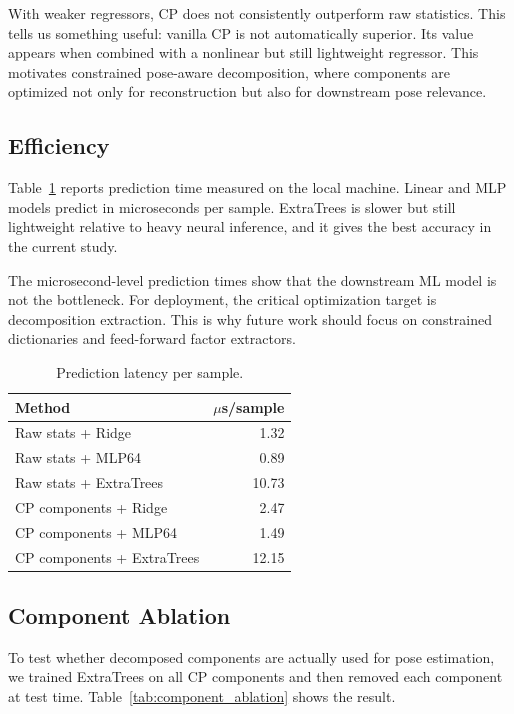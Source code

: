 \documentclass[letterpaper]{article}
\begin{document}
With weaker regressors, CP does not consistently outperform raw statistics. This tells us something useful: vanilla CP is not automatically superior. Its value appears when combined with a nonlinear but still lightweight regressor. This motivates constrained pose-aware decomposition, where components are optimized not only for reconstruction but also for downstream pose relevance.

\subsection{Efficiency}

Table~\ref{tab:efficiency} reports prediction time measured on the local machine. Linear and MLP models predict in microseconds per sample. ExtraTrees is slower but still lightweight relative to heavy neural inference, and it gives the best accuracy in the current study.

The microsecond-level prediction times show that the downstream ML model is not the bottleneck. For deployment, the critical optimization target is decomposition extraction. This is why future work should focus on constrained dictionaries and feed-forward factor extractors.

\begin{table}[t]
\centering
\caption{Prediction latency per sample.}
\label{tab:efficiency}
\begin{tabular}{lr}
\toprule
Method & $\mu$s/sample \\
\midrule
Raw stats + Ridge & 1.32 \\
Raw stats + MLP64 & 0.89 \\
Raw stats + ExtraTrees & 10.73 \\
CP components + Ridge & 2.47 \\
CP components + MLP64 & 1.49 \\
CP components + ExtraTrees & 12.15 \\
\bottomrule
\end{tabular}
\end{table}

\subsection{Component Ablation}

To test whether decomposed components are actually used for pose estimation, we trained ExtraTrees on all CP components and then removed each component at test time. Table~\ref{tab:component_ablation} shows the result.
\end{document}

